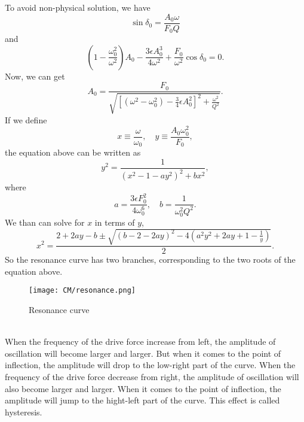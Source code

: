 To avoid non-physical solution, we have
\[\sin\delta_0 = \frac{A_0 \omega}{F_0 Q} \]
and
\[\left ( 1 - \frac{\omega_0^2}{\omega^2}\right ) A_0 - \frac{3\epsilon A_0^3}{4\omega^2} + \frac{F_0}{\omega^2}\cos\delta_0 = 0.\]
Now, we can get
\[A_0 = \frac{F_0}{\sqrt{\left[ (\omega^2 -\omega_0^2) - \frac{3}{4}\epsilon A_0^2 \right ]^2 + \frac{\omega^2}{Q^2} }}.\]
If we define
\[x \equiv \frac{\omega}{\omega_0} ,\quad y \equiv \frac{A_0 \omega_0^2}{F_0},\]
the equation above can be written as
\[y^2 = \frac{1}{(x^2-1-ay^2)^2 + bx^2}, \]
where
\[a = \frac{3\epsilon F_0^2}{4\omega_0^6}, \quad b = \frac{1}{\omega_0^2 Q^2}.\]
We than can solve for $x$ in terms of $y$,
\[x^2 = \frac{2 + 2ay-b \pm \sqrt{(b-2-2ay)^2-4(a^2y^2+2ay+1-\frac{1}{y})}}{2}.\]
So the resonance curve has two branches, corresponding to the two roots of the equation above.
\begin{figure}[!h]
	\centering
	\texttt{[image: CM/resonance.png]}
	\caption{Resonance curve}
\end{figure}
\\ 
When the frequency of the drive force increase from left, the amplitude of oscillation will become larger and larger. But when it comes to the point of inflection, the amplitude will drop to the low-right part of the curve. 
When the frequency of the drive force decrease from right, the amplitude of oscillation will also become larger and larger. When it comes to the point of inflection, the amplitude will jump to the hight-left part of the curve. 
This effect is called hysteresis.

